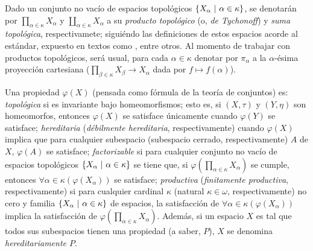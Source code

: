     Dado un conjunto no vacío de espacios topológicos $\{X_\alpha \text{ $|$ } \alpha \in \kappa \}$, se denotarán por $ \prod_{\alpha \in \kappa} X_\alpha$ y $ \coprod_{\alpha \in \kappa} X_\alpha$ a su \textit{producto topológico} (o, \textit{de Tychonoff}) y \textit{suma topológica}, respectivamete; siguiéndo las definiciones de estos espacios acorde al estándar, expuesto en textos como \cite{fidelElementos,munkresTopology}, entre otros. Al momento de trabajar con productos topológicos, será usual, para cada $\alpha \in \kappa$ denotar por $\pi_\alpha$ a la $\alpha$-ésima proyección cartesiana ($ \prod_{\beta \in \kappa} X_\beta \to X_\alpha$ dada por $f \mapsto f(\alpha)$).
    
    Una propiedad $\varphi(X)$ (pensada como fórmula de la teoría de conjuntos) es: \textit{topológica} si es invariante bajo homeomorfismos; esto es, si $(X,\tau)$ y $(Y,\eta)$ son homeomorfos, entonces $\varphi(X)$ se satisface únicamente cuando $\varphi(Y)$ se satisface; \textit{hereditaria} (\textit{débilmente hereditaria}, respectivamente) cuando $\varphi(X)$ implica que para cualquier subespacio (subespacio cerrado, respectivamente) $A$ de $X$, $\varphi(A)$ se satisface; \textit{factorizable} si para cualquier conjunto no vacío de espacios topológicos $\{X_\alpha \text{ $|$ } \alpha \in \kappa \}$ se tiene que, si $\varphi(\prod_{\alpha \in \kappa} X_\alpha)$ se cumple, entonces $\forall \alpha \in \kappa (\varphi(X_\alpha))$ se satisface; \textit{productiva} (\textit{finitamente productiva}, respectivamente) si para cualquier cardinal $\kappa$ (natural $\kappa \in \omega$, respectivamente) no cero y familia $\{X_\alpha \text{ $|$ } \alpha \in \kappa \}$ de espacios, la satisfacción de $\forall \alpha \in \kappa (\varphi(X_\alpha))$ implica la satisfacción de $\varphi(\prod_{\alpha \in \kappa} X_\alpha)$. Además, si un espacio $X$ es tal que todos sus subespacios tienen una propiedad (a saber, $P$), $X$ se denomina \textit{hereditariamente $P$}.

